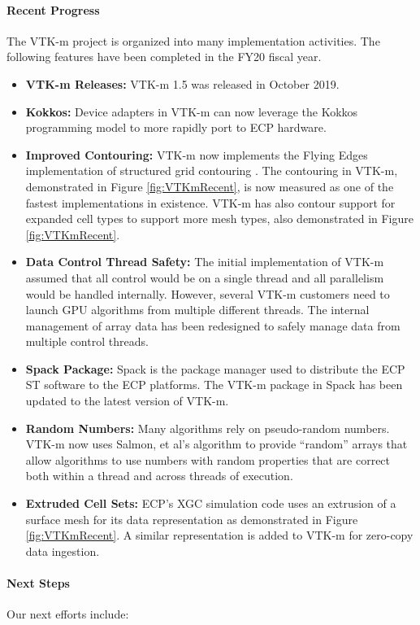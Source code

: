 \paragraph{Recent Progress}
The VTK-m project is organized into many implementation activities.
The following features have been completed in the FY20 fiscal year.

\begin{itemize}
\item \textbf{VTK-m Releases:}
  VTK-m 1.5 was released in October 2019.
\item \textbf{Kokkos:}
  Device adapters in VTK-m can now leverage the Kokkos programming model to more rapidly port to ECP hardware.
\item \textbf{Improved Contouring:}
  VTK-m now implements the Flying Edges implementation of structured grid contouring \cite{Schroeder2015}.
  The contouring in VTK-m, demonstrated in Figure \ref{fig:VTKmRecent}, is now measured as one of the fastest implementations in existence.
  VTK-m has also contour support for expanded cell types to support more mesh types, also demonstrated in Figure \ref{fig:VTKmRecent}.
\item \textbf{Data Control Thread Safety:}
  The initial implementation of VTK-m assumed that all control would be on a single thread and all parallelism would be handled internally.
  However, several VTK-m customers need to launch GPU algorithms from multiple different threads.
  The internal management of array data has been redesigned to safely manage data from multiple control threads.
\item \textbf{Spack Package:}
  Spack \cite{Gamblin2015} is the package manager used to distribute the ECP ST software to the ECP platforms.
  The VTK-m package in Spack has been updated to the latest version of VTK-m.
\item \textbf{Random Numbers:}
  Many algorithms rely on pseudo-random numbers.
  VTK-m now uses Salmon, et al's algorithm \cite{Salmon2011} to provide ``random'' arrays that allow algorithms to use numbers with random properties that are correct both within a thread and across threads of execution.
\item \textbf{Extruded Cell Sets:}
  ECP's XGC simulation code uses an extrusion of a surface mesh for its data representation as demonstrated in Figure \ref{fig:VTKmRecent}.
  A similar representation is added to VTK-m for zero-copy data ingestion.
\end{itemize}

\paragraph{Next Steps}
Our next efforts include:

